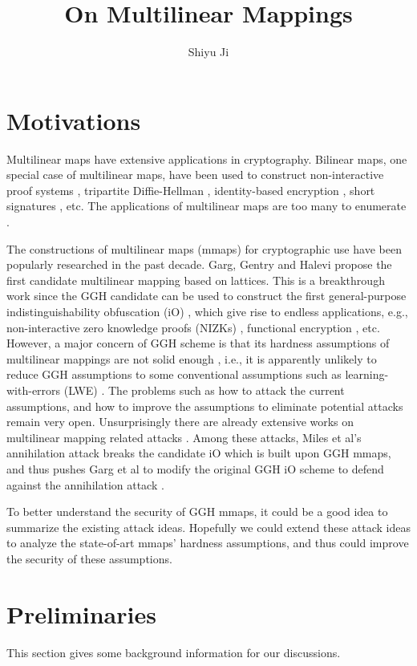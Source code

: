 \documentclass[10pt]{article}
\theoremstyle{plain}
\theoremstyle{definition}
\theoremstyle{remark}
\begin{document}
\title{On Multilinear Mappings}
\author{Shiyu Ji}
\maketitle

\section{Motivations}
Multilinear maps have extensive applications in cryptography. Bilinear maps, one special case of multilinear maps, have been used to construct non-interactive proof systems \cite{GS08}, tripartite Diffie-Hellman \cite{Joux00}, identity-based encryption \cite{BF01}, short signatures \cite{BLS01}, etc. The applications of multilinear maps are too many to enumerate \cite{GGH13a}. 

The constructions of multilinear maps (mmaps) for cryptographic use have been popularly researched in the past decade. Garg, Gentry and Halevi \cite{GGH13a} propose the first candidate multilinear mapping based on lattices. This is a breakthrough work since the GGH candidate can be used to construct the first general-purpose indistinguishability obfuscation (iO) \cite{GGH13b}, which give rise to endless applications, e.g., non-interactive zero knowledge proofs (NIZKs) \cite{SW14}, functional encryption \cite{GGH13b}, etc. However, a major concern of GGH scheme is that its hardness assumptions of multilinear mappings are not solid enough \cite{GGH13a}, i.e., it is apparently unlikely to reduce GGH assumptions to some conventional assumptions such as learning-with-errors (LWE) \cite{Reg09}. The problems such as how to attack the current assumptions, and how to improve the assumptions to eliminate potential attacks remain very open. Unsurprisingly there are already extensive works on multilinear mapping related attacks \cite{CGH15, HJ15, CDPR15, CJL16, MSZ16}. Among these attacks, Miles et al's annihilation attack \cite{MSZ16} breaks the candidate iO \cite{GGH13b} which is built upon GGH mmaps, and thus pushes Garg et al to modify the original GGH iO scheme to defend against the annihilation attack \cite{GMS16}.

To better understand the security of GGH mmaps, it could be a good idea to summarize the existing attack ideas. Hopefully we could extend these attack ideas to analyze the state-of-art mmaps' hardness assumptions, and thus could improve the security of these assumptions.

\section{Preliminaries}
This section gives some background information for our discussions.
\end{document}
